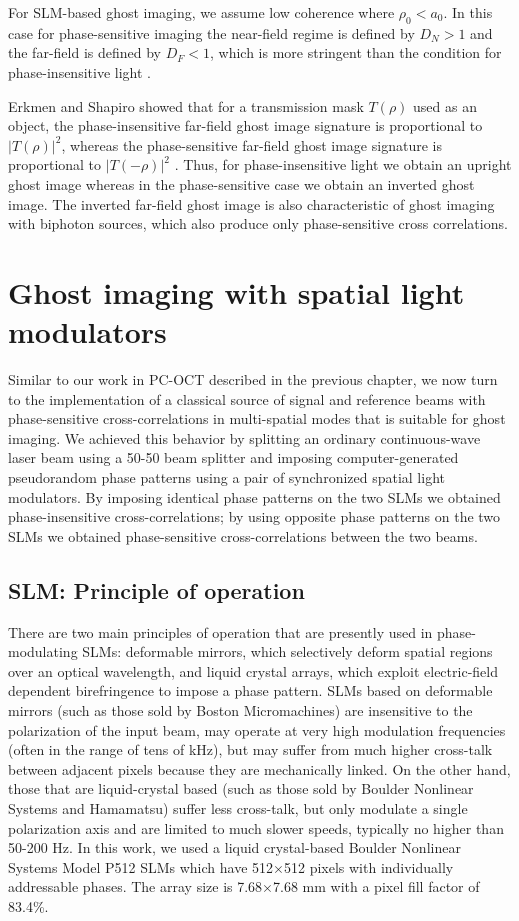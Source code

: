 For SLM-based ghost imaging, we assume low coherence where $\rho_0 < a_0$. In this case for phase-sensitive imaging the near-field regime is defined by $D_N > 1$ and the far-field is defined by $D_F < 1$, which is more stringent than the condition for phase-insensitive light \cite{erkmen-unified}.

Erkmen and Shapiro showed that for a transmission mask $T(\rho)$ used as an object, the phase-insensitive far-field ghost image signature is proportional to $|T(\rho)|^2$, whereas the phase-sensitive far-field ghost image signature is proportional to $|T(-\rho)|^2$ \cite{erkmen-unified}. Thus, for phase-insensitive light we obtain an upright ghost image whereas in the phase-sensitive case we obtain an inverted ghost image. The inverted far-field ghost image is also characteristic of ghost imaging with biphoton sources, which also produce only phase-sensitive cross correlations.


\section{Ghost imaging with spatial light modulators}

Similar to our work in PC-OCT described in the previous chapter, we now turn to the implementation of a classical source of signal and reference beams with phase-sensitive cross-correlations in multi-spatial modes that is suitable for ghost imaging. We achieved this behavior by splitting an ordinary continuous-wave laser beam using a 50-50 beam splitter and imposing computer-generated pseudorandom phase patterns using a pair of synchronized spatial light modulators. By imposing identical phase patterns on the two SLMs we obtained phase-insensitive cross-correlations; by using opposite phase patterns on the two SLMs we obtained phase-sensitive cross-correlations between the two beams.

\subsection{SLM: Principle of operation}

There are two main principles of operation that are presently used in phase-modulating SLMs: deformable mirrors, which selectively deform spatial regions over an optical wavelength, and liquid crystal arrays, which exploit electric-field dependent birefringence to impose a phase pattern. SLMs based on deformable mirrors (such as those sold by Boston Micromachines) are insensitive to the polarization of the input beam, may operate at very high modulation frequencies (often in the range of tens of kHz), but may suffer from much higher cross-talk between adjacent pixels because they are mechanically linked. On the other hand, those that are liquid-crystal based (such as those sold by Boulder Nonlinear Systems and Hamamatsu) suffer less cross-talk, but only modulate a single polarization axis and are limited to much slower speeds, typically no higher than 50-200 Hz. In this work, we used a liquid crystal-based Boulder Nonlinear Systems Model P512 SLMs which have 512$\times$512 pixels with individually addressable phases. The array size is 7.68$\times$7.68 mm with a pixel fill factor of 83.4\%.

